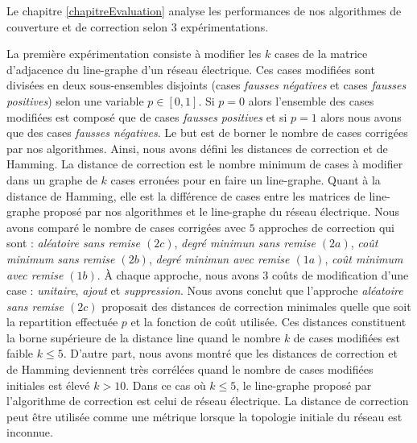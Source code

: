 Le chapitre \ref{chapitreEvaluation} analyse les performances de nos algorithmes de couverture et de correction selon $3$ exp\'erimentations. 

La premi\`ere exp\'erimentation consiste \`a modifier les $k$ cases de la matrice d'adjacence du line-graphe d'un r\'eseau \'electrique. Ces cases modifi\'ees sont divis\'ees en deux sous-ensembles disjoints (cases {\em fausses n\'egatives} et cases {\em fausses positives}) selon une variable $p \in [0,1]$. Si $p = 0$ alors l'ensemble des cases modifi\'ees est compos\'e que de cases  {\em fausses positives} et si $p=1$ alors nous avons que des cases {\em fausses n\'egatives}. 
Le but est de borner le nombre de cases corrig\'ees par nos algorithmes.
Ainsi, nous avons d\'efini les distances de correction et de Hamming. 
La distance de correction est le nombre minimum de cases \`a modifier dans un graphe de $k$ cases erron\'ees pour en faire un line-graphe. 
Quant \`a la distance de Hamming, elle est la diff\'erence de cases entre les matrices de line-graphe propos\'e par nos algorithmes et le line-graphe du r\'eseau \'electrique.
Nous avons compar\'e le nombre de cases corrig\'ees avec $5$ approches de correction qui sont : {\em al\'eatoire sans remise $(2c)$}, {\em degr\'e minimun sans remise $(2a)$}, {\em co\^ut minimum sans remise $(2b)$}, {\em degr\'e minimun avec remise $(1a)$}, {\em co\^ut minimum avec remise $(1b)$}. \`A chaque approche, nous avons $3$ co\^uts de modification  d'une case : {\em unitaire}, {\em ajout} et {\em suppression}.
Nous avons conclut que l'approche  {\em al\'eatoire sans remise $(2c)$} proposait des distances de correction minimales quelle que soit la repartition effectu\'ee $p$ et la fonction de co\^ut utilis\'ee. Ces distances constituent la borne sup\'erieure de la distance line quand le nombre $k$ de cases modifi\'ees est faible $k \le 5$. 
D'autre part, nous avons montr\'e que les distances de correction et de Hamming deviennent tr\`es corr\'el\'ees quand le nombre de cases modifi\'ees initiales est \'elev\'e $k > 10$. Dans ce cas o\`u $k \le 5$, le line-graphe propos\'e par l'algorithme de correction est celui de r\'eseau \'electrique. La distance de correction peut \^etre utilis\'ee comme une m\'etrique lorsque la topologie initiale du r\'eseau est inconnue.
\newline

